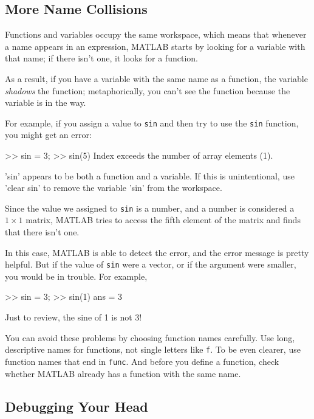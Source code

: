 \documentclass[../../book.tex]{subfiles}
\begin{document}
\subsection{More Name Collisions}

Functions and variables occupy the same workspace, which means
that whenever a name appears in an expression, MATLAB starts by looking
for a variable with that name; if there isn't one, it looks for
a function.


As a result, if you have a variable with the same name as a function,
the variable \emph{shadows} the function; metaphorically, you can't see the function because the variable is in the way.

For example, if you assign
a value to \lstinline{sin} and then try to use the \lstinline{sin} function, you
might get an error:

\begin{code}
>> sin = 3;
>> sin(5)
Index exceeds the number of array elements (1).

'sin' appears to be both a function and a variable.
If this is unintentional, use 'clear sin' to remove
the variable 'sin' from the workspace.
\end{code}

Since the value we assigned to \lstinline{sin} is a number, and a number is considered a $1 \times 1$ matrix, MATLAB tries to access the fifth element of the matrix and finds that there isn't one.

In this case, MATLAB is able to detect the error, and the error message is pretty helpful.
But if the value of \lstinline{sin} were a vector, or if the argument were smaller, you would be in trouble.  For example,

\begin{code}
>> sin = 3;
>> sin(1)
ans = 3
\end{code}

Just to review, the sine of 1 is not 3!

You can avoid these problems by choosing function names carefully. Use long, descriptive names for functions, not single letters like \lstinline{f}. To be even clearer, use function names that end in \lstinline{func}. And before you define a function, check whether MATLAB already has a function with the same name.

\subsection{Debugging Your Head}
\end{document}

